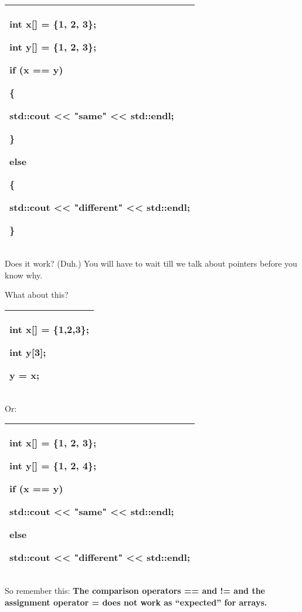 \documentclass[
]{article}
\begin{document}
\begin{longtable}[]{@{}l@{}}
\toprule
\endhead
\begin{minipage}[t]{0.97\columnwidth}\raggedright
int x{[}{]} = \{1, 2, 3\};

int y{[}{]} = \{1, 2, 3\};

if (x == y)

\{

std::cout \textless\textless{} "same" \textless\textless{} std::endl;

\}

else

\{

std::cout \textless\textless{} "different" \textless\textless{}
std::endl;

\}\strut
\end{minipage}\tabularnewline
\bottomrule
\end{longtable}

Does it work? (Duh.) You will have to wait till we talk about pointers
before you know why.

What about this?

\begin{longtable}[]{@{}l@{}}
\toprule
\endhead
\begin{minipage}[t]{0.97\columnwidth}\raggedright
int x{[}{]} = \{1,2,3\};

int y{[}3{]};

y = x;\strut
\end{minipage}\tabularnewline
\bottomrule
\end{longtable}

Or:

\begin{longtable}[]{@{}l@{}}
\toprule
\endhead
\begin{minipage}[t]{0.97\columnwidth}\raggedright
int x{[}{]} = \{1, 2, 3\};

int y{[}{]} = \{1, 2, 4\};

if (x == y)

std::cout \textless\textless{} "same" \textless\textless{} std::endl;

else

std::cout \textless\textless{} "different" \textless\textless{}
std::endl;\strut
\end{minipage}\tabularnewline
\bottomrule
\end{longtable}

So remember this: \textbf{The comparison operators == and != and the
assignment operator = does not work as ``expected'' for arrays.}
\end{document}
